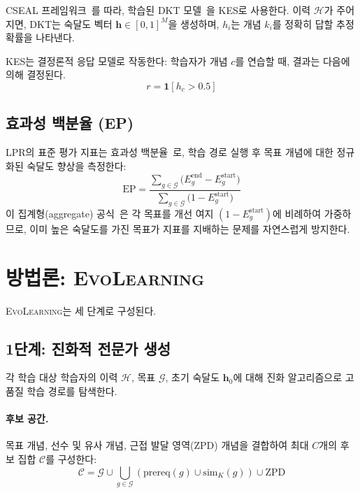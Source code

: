 \documentclass[11pt,a4paper]{article}
\newcommand{\ours}{\textsc{EvoLearning}}
\newcommand{\ep}{\mathrm{EP}}
\begin{document}
CSEAL 프레임워크~\cite{liu2019cseal}를 따라, 학습된 DKT 모델~\cite{piech2015dkt}을 KES로 사용한다. 이력 $\mathcal{H}$가 주어지면, DKT는 숙달도 벡터 $\mathbf{h} \in [0,1]^M$을 생성하며, $h_i$는 개념 $k_i$를 정확히 답할 추정 확률을 나타낸다.

KES는 결정론적 응답 모델로 작동한다: 학습자가 개념 $c$를 연습할 때, 결과는 다음에 의해 결정된다.
\begin{equation}
    r = \mathbf{1}[h_c > 0.5]
\end{equation}

\subsection{효과성 백분율 (EP)}

LPR의 표준 평가 지표는 효과성 백분율~\cite{liu2019cseal,cheng2025knowlp}로, 학습 경로 실행 후 목표 개념에 대한 정규화된 숙달도 향상을 측정한다:
\begin{equation}
    \ep = \frac{\sum_{g \in \mathcal{G}} \bigl(E_g^{\text{end}} - E_g^{\text{start}}\bigr)}{\sum_{g \in \mathcal{G}} \bigl(1 - E_g^{\text{start}}\bigr)}
\end{equation}
이 집계형(aggregate) 공식~\cite{cheng2025knowlp}은 각 목표를 개선 여지 $(1 - E_g^{\text{start}})$에 비례하여 가중하므로, 이미 높은 숙달도를 가진 목표가 지표를 지배하는 문제를 자연스럽게 방지한다.

\section{방법론: \ours{}}

\ours{}는 세 단계로 구성된다.

\subsection{1단계: 진화적 전문가 생성}

각 학습 대상 학습자의 이력 $\mathcal{H}$, 목표 $\mathcal{G}$, 초기 숙달도 $\mathbf{h}_0$에 대해 진화 알고리즘으로 고품질 학습 경로를 탐색한다.

\paragraph{후보 공간.} 목표 개념, 선수 및 유사 개념, 근접 발달 영역(ZPD) 개념을 결합하여 최대 $C$개의 후보 집합 $\mathcal{C}$를 구성한다:
\begin{equation}
    \mathcal{C} = \mathcal{G} \cup \bigcup_{g \in \mathcal{G}} \left(\text{prereq}(g) \cup \text{sim}_K(g)\right) \cup \text{ZPD}
\end{equation}
\end{document}
